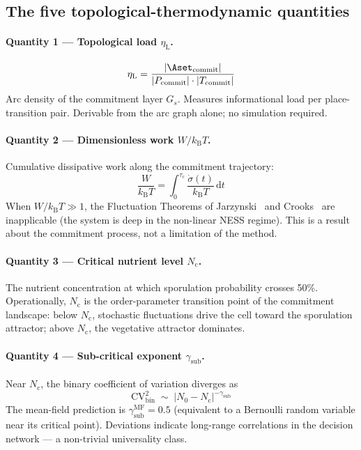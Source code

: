\documentclass[11pt,a4paper]{article}
\newcommand{\kB}{k_{\mathrm{B}}}
\newcommand{\CV}{\mathrm{CV}}
\newcommand{\EPR}{\dot{\sigma}}
\newcommand{\etaL}{\eta_{\mathrm{L}}}
\newcommand{\gsub}{\gamma_{\mathrm{sub}}}
\newcommand{\Nc}{N_{\mathrm{c}}}
\begin{document}
\subsection{The five topological-thermodynamic quantities}
\label{sec:five_quantities}

\paragraph{Quantity 1 --- Topological load $\etaL$.}
\begin{equation}
  \etaL = \frac{|\Aset_{\mathrm{commit}}|}{|P_{\mathrm{commit}}|
               \cdot |T_{\mathrm{commit}}|}
  \label{eq:eta_L}
\end{equation}
Arc density of the commitment layer $G_s$.
Measures informational load per place-transition pair.
Derivable from the arc graph alone; no simulation required.

\paragraph{Quantity 2 --- Dimensionless work $W/\kB T$.}
Cumulative dissipative work along the commitment trajectory:
\begin{equation}
  \frac{W}{\kB T} = \int_0^{\tau_c} \frac{\EPR(t)}{\kB T}\, \mathrm{d}t
  \label{eq:W_kBT}
\end{equation}
When $W/\kB T \gg 1$, the Fluctuation Theorems of Jarzynski~\cite{Jarzynski1997}
and Crooks~\cite{Crooks1999} are inapplicable (the system is deep in
the non-linear NESS regime).
This is a result about the commitment process, not a limitation of the
method.

\paragraph{Quantity 3 --- Critical nutrient level $\Nc$.}
The nutrient concentration at which sporulation probability crosses 50\%.
Operationally, $\Nc$ is the order-parameter transition point of the
commitment landscape: below $\Nc$, stochastic fluctuations drive the
cell toward the sporulation attractor; above $\Nc$, the vegetative
attractor dominates.

\paragraph{Quantity 4 --- Sub-critical exponent $\gsub$.}
Near $\Nc$, the binary coefficient of variation diverges as
\begin{equation}
  \CV^2_{\mathrm{bin}} \;\sim\; |N_0 - \Nc|^{-\gsub}
  \label{eq:gsub}
\end{equation}
The mean-field prediction is $\gsub^{\mathrm{MF}} = 0.5$ (equivalent to
a Bernoulli random variable near its critical point).
Deviations indicate long-range correlations in the decision network ---
a non-trivial universality class.
\end{document}
